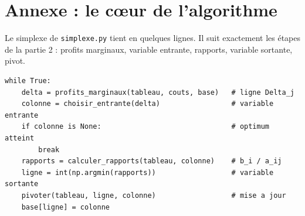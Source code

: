 \documentclass[11pt,a4paper]{article}
\begin{document}
\section*{Annexe : le cœur de l'algorithme}
Le simplexe de \texttt{simplexe.py} tient en quelques lignes. Il suit exactement les étapes
de la partie 2 : profits marginaux, variable entrante, rapports, variable sortante, pivot.

\begin{lstlisting}
while True:
    delta = profits_marginaux(tableau, couts, base)   # ligne Delta_j
    colonne = choisir_entrante(delta)                 # variable entrante
    if colonne is None:                               # optimum atteint
        break
    rapports = calculer_rapports(tableau, colonne)    # b_i / a_ij
    ligne = int(np.argmin(rapports))                  # variable sortante
    pivoter(tableau, ligne, colonne)                  # mise a jour
    base[ligne] = colonne
\end{lstlisting}
\end{document}
